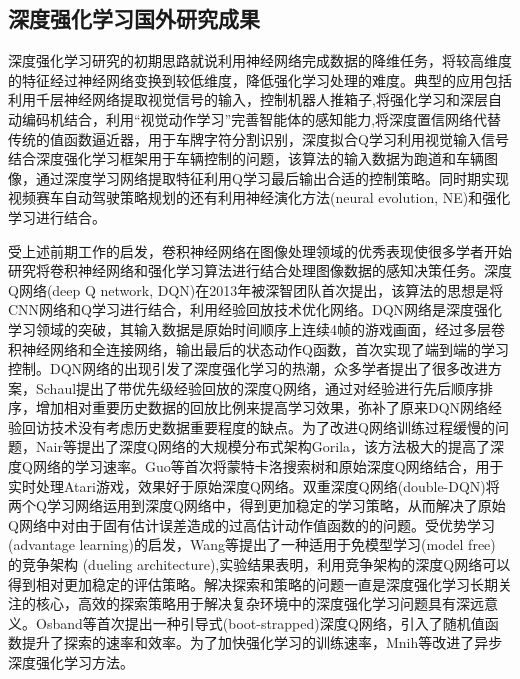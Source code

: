 \subsection{深度强化学习国外研究成果}
深度强化学习研究的初期思路就说利用神经网络完成数据的降维任务，将较高维度的特征经过神经网络变换到较低维度，降低强化学习处理的难度。典型的应用包括利用千层神经网络提取视觉信号的输入，控制机器人推箱子\cite{Shibata2003Acquisition},将强化学习和深层自动编码机结合，利用“视觉动作学习”完善智能体的感知能力\cite{Lange2010Deep},将深度置信网络代替传统的值函数逼近器，用于车牌字符分割识别\cite{Abtahi2015A}，深度拟合Q学习\cite{Lange2012Autonomousd}利用视觉输入信号结合深度强化学习框架用于车辆控制的问题，该算法的输入数据为跑道和车辆图像，通过深度学习网络提取特征利用Q学习最后输出合适的控制策略。同时期实现视频赛车自动驾驶策略规划的还有利用神经演化方法(neural evolution, NE)和强化学习进行结合\cite{Kumar2014Understanding}。

受上述前期工作的启发，卷积神经网络在图像处理领域的优秀表现使很多学者开始研究将卷积神经网络和强化学习算法进行结合处理图像数据的感知决策任务。深度Q网络(deep Q network, DQN)\cite{Mnih2013Playing}在2013年被深智团队首次提出，该算法的思想是将CNN网络和Q学习进行结合，利用经验回放技术优化网络。DQN网络是深度强化学习领域的突破，其输入数据是原始时间顺序上连续4帧的游戏画面，经过多层卷积神经网络和全连接网络，输出最后的状态动作Q函数，首次实现了端到端的学习控制。DQN网络的出现引发了深度强化学习的热潮，众多学者提出了很多改进方案，Schaul提出了带优先级经验回放的深度Q网络\cite{Schaul2015Prioritized}，通过对经验进行先后顺序排序，增加相对重要历史数据的回放比例来提高学习效果，弥补了原来DQN网络经验回访技术没有考虑历史数据重要程度的缺点。为了改进Q网络训练过程缓慢的问题，Nair等提出了深度Q网络的大规模分布式架构Gorila\cite{Goeringer2013Massively}，该方法极大的提高了深度Q网络的学习速率。Guo等首次将蒙特卡洛搜索树和原始深度Q网络结合\cite{Guo2014Deep}，用于实时处理Atari游戏，效果好于原始深度Q网络。双重深度Q网络(double-DQN)\cite{DQN}将两个Q学习网络运用到深度Q网络中，得到更加稳定的学习策略，从而解决了原始Q网络中对由于固有估计误差造成的过高估计动作值函数的的问题。受优势学习(advantage learning)的启发，Wang等提出了一种适用于免模型学习(model free) 的竞争架构 (dueling architecture),实验结果表明，利用竞争架构的深度Q网络可以得到相对更加稳定的评估策略。解决探索和策略的问题一直是深度强化学习长期关注的核心，高效的探索策略用于解决复杂环境中的深度强化学习问题具有深远意义。Osband等首次提出一种引导式(boot-strapped)深度Q网络\cite{Osband2016Deep}，引入了随机值函数提升了探索的速率和效率。为了加快强化学习的训练速率，Mnih等改进了异步深度强化学习方法\cite{Mnih2016Asynchronous}。
